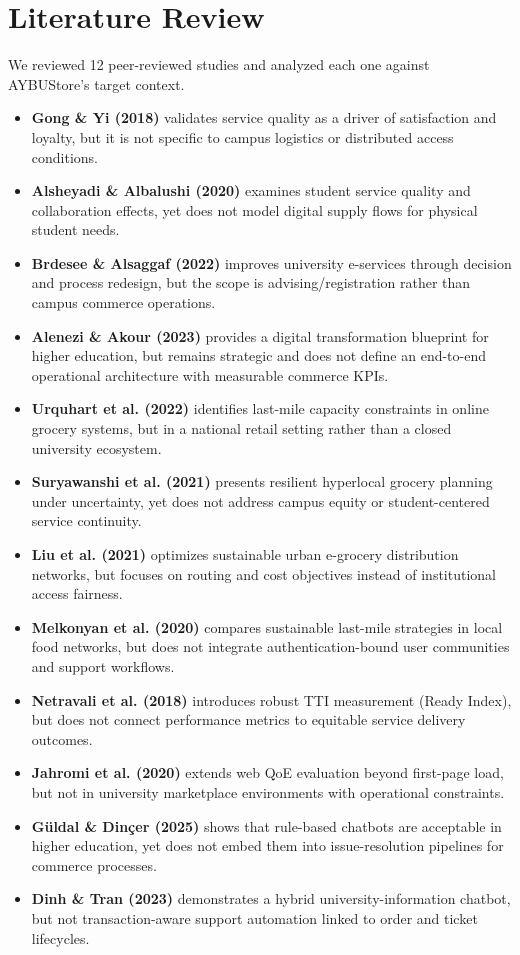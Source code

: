 \documentclass[11pt,a4paper]{article}
\begin{document}
\section{Literature Review}
We reviewed 12 peer-reviewed studies and analyzed each one against AYBUStore's target context.
\begin{itemize}
    \item \textbf{Gong \& Yi (2018)} validates service quality as a driver of satisfaction and loyalty, but it is not specific to campus logistics or distributed access conditions.
    \item \textbf{Alsheyadi \& Albalushi (2020)} examines student service quality and collaboration effects, yet does not model digital supply flows for physical student needs.
    \item \textbf{Brdesee \& Alsaggaf (2022)} improves university e-services through decision and process redesign, but the scope is advising/registration rather than campus commerce operations.
    \item \textbf{Alenezi \& Akour (2023)} provides a digital transformation blueprint for higher education, but remains strategic and does not define an end-to-end operational architecture with measurable commerce KPIs.
    \item \textbf{Urquhart et al. (2022)} identifies last-mile capacity constraints in online grocery systems, but in a national retail setting rather than a closed university ecosystem.
    \item \textbf{Suryawanshi et al. (2021)} presents resilient hyperlocal grocery planning under uncertainty, yet does not address campus equity or student-centered service continuity.
    \item \textbf{Liu et al. (2021)} optimizes sustainable urban e-grocery distribution networks, but focuses on routing and cost objectives instead of institutional access fairness.
    \item \textbf{Melkonyan et al. (2020)} compares sustainable last-mile strategies in local food networks, but does not integrate authentication-bound user communities and support workflows.
    \item \textbf{Netravali et al. (2018)} introduces robust TTI measurement (Ready Index), but does not connect performance metrics to equitable service delivery outcomes.
    \item \textbf{Jahromi et al. (2020)} extends web QoE evaluation beyond first-page load, but not in university marketplace environments with operational constraints.
    \item \textbf{Güldal \& Dinçer (2025)} shows that rule-based chatbots are acceptable in higher education, yet does not embed them into issue-resolution pipelines for commerce processes.
    \item \textbf{Dinh \& Tran (2023)} demonstrates a hybrid university-information chatbot, but not transaction-aware support automation linked to order and ticket lifecycles.
\end{itemize}
\end{document}
